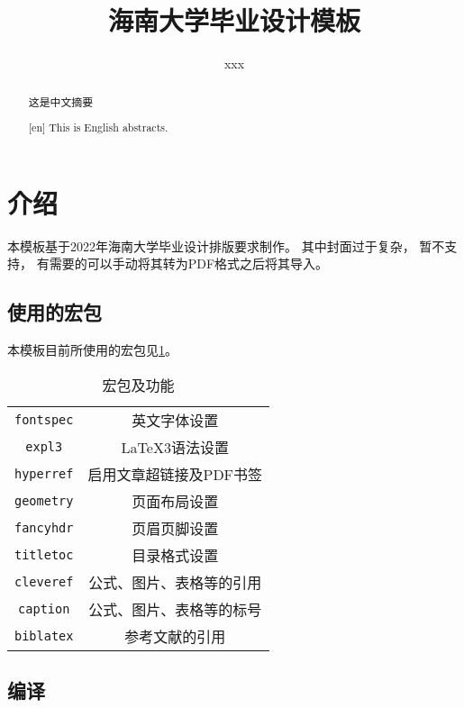 \documentclass{hainanuthesis}
\title{海南大学毕业设计模板}
\author{xxx}
\begin{document}
\makecover
\begin{abstract}
    这是中文摘要
\end{abstract}

\begin{abstract}[en]
    This is English abstracts.
\end{abstract}

\newpage
\tableofcontents
\newpage

\section{介绍}

本模板基于2022年海南大学毕业设计排版要求制作。
其中封面过于复杂，
暂不支持，
有需要的可以手动将其转为PDF格式之后将其导入。

\subsection{使用的宏包}

本模板目前所使用的宏包见\cref{tb:01}。

\begin{table}[!htbp]
    \begin{center}
        \caption{宏包及功能}
        \label{tb:01}
        \begin{tabular}{cc}
            \verb|fontspec| & 英文字体设置             \\
            \verb|expl3|    & \LaTeX 3语法设置         \\
            \verb|hyperref| & 启用文章超链接及PDF书签  \\
            \verb|geometry| & 页面布局设置             \\
            \verb|fancyhdr| & 页眉页脚设置             \\
            \verb|titletoc| & 目录格式设置             \\
            \verb|cleveref| & 公式、图片、表格等的引用 \\
            \verb|caption|  & 公式、图片、表格等的标号 \\
            \verb|biblatex| & 参考文献的引用           \\
        \end{tabular}
    \end{center}
\end{table}

\subsection{编译}
\end{document}

